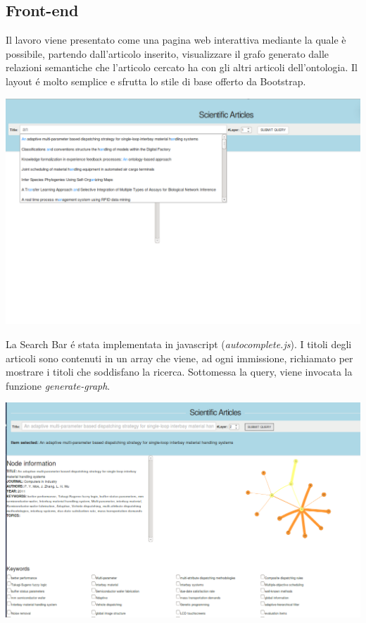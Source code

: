 \documentclass[11pt,a4paper]{article}
\begin{document}
\subsection{Front-end}
Il lavoro viene presentato come una pagina web interattiva mediante la quale è possibile, partendo dall'articolo inserito, visualizzare il grafo generato dalle relazioni semantiche che l'articolo cercato ha con gli altri articoli dell'ontologia. Il layout \'e molto semplice e sfrutta lo stile di base offerto da Bootstrap. 

\begin{center}
\includegraphics[scale=0.40]{immaginiTesina/vuoto.png}
\end{center}

La Search Bar \'e stata implementata in javascript (\textit{autocomplete.js}). I titoli degli articoli sono contenuti in un array che viene, ad ogni immissione, richiamato per mostrare i titoli che soddisfano la ricerca. Sottomessa la query, viene invocata la funzione \textit{generate-graph}. \newline \newline\newline


\begin{center}
\includegraphics[scale=0.40]{immaginiTesina/2layer.png}
\end{center}
\end{document}
